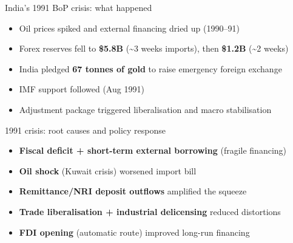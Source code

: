 \documentclass[
  ignorenonframetext,
  aspectratio=169,
]{beamer}
\makeatletter
\providecommand{\tightlist}{%
  \setlength{\itemsep}{0pt}\setlength{\parskip}{0pt}}
\let\quarto@originallabel\label
\DeclareRobustCommand*{\label}[1]{\quarto@originallabel{#1}}
\makeatother
\begin{document}
\begin{frame}{India's 1991 BoP crisis: what happened}
\label{indias-1991-bop-crisis-what-happened}
\begin{itemize}
\tightlist
\item
  Oil prices spiked and external financing dried up (1990--91)
\item
  Forex reserves fell to \textbf{\$5.8B} (\textasciitilde3 weeks
  imports), then \textbf{\$1.2B} (\textasciitilde2 weeks)
\item
  India pledged \textbf{67 tonnes of gold} to raise emergency foreign
  exchange
\item
  IMF support followed (Aug 1991)
\item
  Adjustment package triggered liberalisation and macro stabilisation
\end{itemize}
\end{frame}

\begin{frame}{1991 crisis: root causes and policy response}
\label{crisis-root-causes-and-policy-response}
\begin{itemize}
\tightlist
\item
  \textbf{Fiscal deficit + short-term external borrowing} (fragile
  financing)
\item
  \textbf{Oil shock} (Kuwait crisis) worsened import bill
\item
  \textbf{Remittance/NRI deposit outflows} amplified the squeeze
\item
  \textbf{Trade liberalisation + industrial delicensing} reduced
  distortions
\item
  \textbf{FDI opening} (automatic route) improved long-run financing
\end{itemize}

\end{frame}
\end{document}
